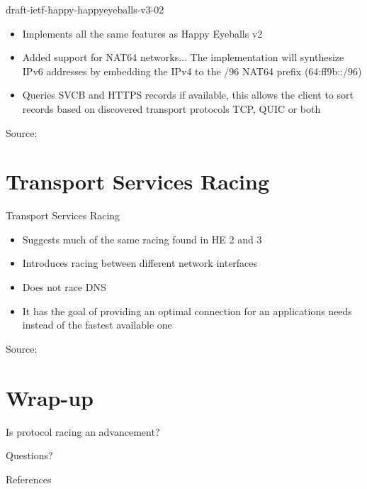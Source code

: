 \documentclass[aspectratio=169]{beamer}
\begin{document}
\begin{frame}{draft-ietf-happy-happyeyeballs-v3-02}
  \begin{itemize}
    \item Implements all the same features as Happy Eyeballs v2
    \item Added support for NAT64 networks... The implementation will synthesize IPv6 addresses by embedding the IPv4 to the /96 NAT64 prefix (64:ff9b::/96)
    \item Queries SVCB and HTTPS records if available, this allows the client to sort records based on discovered transport protocols TCP, QUIC or both
  \end{itemize}
  \centering
  {\tiny Source: }
\end{frame}

\section{Transport Services Racing}
\begin{frame}{Transport Services Racing}
  \begin{itemize}
    \item Suggests much of the same racing found in HE 2 and 3
    \item Introduces racing between different network interfaces
    \item Does not race DNS
    \item It has the goal of providing an optimal connection for an applications needs instead of the fastest available one
  \end{itemize}
  \centering
  {\tiny Source: }
\end{frame}

\section{Wrap-up}
\begin{frame}
  \centering
  \vfill
  {\LARGE Is protocol racing an advancement?}
  \vfill
\end{frame}

\begin{frame}
  \centering
  \vfill
  {\LARGE Questions?}
  \vfill
\end{frame}

\begin{frame}[allowframebreaks]{References}
  \printbibliography
\end{frame}
\end{document}
